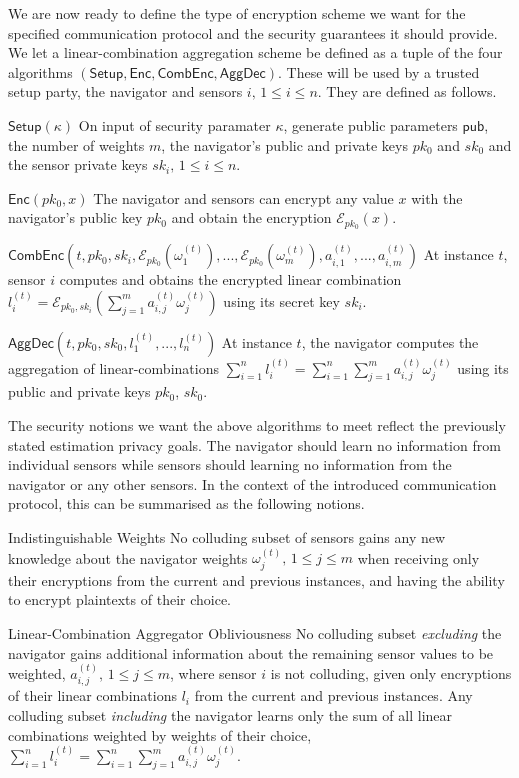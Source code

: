 \documentclass[10pt,letterpaper,oneside,twocolumn,journal]{IEEEtran}
\theoremstyle{definition}
\theoremstyle{definition}
\theoremstyle{remark}
\newcommand\shrtdots{\!...}
\begin{document}
We are now ready to define the type of encryption scheme we want for the specified communication protocol and the security guarantees it should provide. We let a linear-combination aggregation scheme be defined as a tuple of the four algorithms $(\mathsf{Setup}, \mathsf{Enc}, \mathsf{CombEnc}, \mathsf{AggDec})$. These will be used by a trusted setup party, the navigator and sensors $i,\,1\leq i \leq n$. They are defined as follows.
\begin{LaTeXdescription}
    \item[$\mathsf{Setup}(\kappa)$] On input of security paramater $\kappa$, generate public parameters $\mathsf{pub}$, the number of weights $m$, the navigator's public and private keys $pk_0$ and $sk_0$ and the sensor private keys $sk_i,\,1\leq i \leq n$.
    \item[$\mathsf{Enc}(pk_0, x)$] The navigator and sensors can encrypt any value $x$ with the navigator's public key $pk_0$ and obtain the encryption $\mathcal{E}_{pk_0}(x)$.
    \item[$\mathsf{CombEnc}(t, pk_0, sk_i, \mathcal{E}_{pk_0}(\omega_1^{(t)}),\shrtdots,\mathcal{E}_{pk_0}(\omega_m^{(t)}), a^{(t)}_{i,1},\shrtdots,a^{(t)}_{i,m})$] At instance $t$, sensor $i$ computes and obtains the encrypted linear combination $l^{(t)}_i = \mathcal{E}_{pk_0,sk_i}(\sum^m_{j=1}a^{(t)}_{i,j}\omega^{(t)}_j)$ using its secret key $sk_i$.
    \item[$\mathsf{AggDec}(t, pk_0, sk_0, l^{(t)}_1,\shrtdots,l^{(t)}_n)$] At instance $t$, the navigator computes the aggregation of linear-combinations $\sum^{n}_{i=1}l_i^{(t)}=\sum^{n}_{i=1}\sum^{m}_{j=1} a^{(t)}_{i,j}\omega^{(t)}_j$ using its public and private keys $pk_0$, $sk_0$.
\end{LaTeXdescription}
The security notions we want the above algorithms to meet reflect the previously stated estimation privacy goals. The navigator should learn no information from individual sensors while sensors should learning no information from the navigator or any other sensors. In the context of the introduced communication protocol, this can be summarised as the following notions.
\begin{LaTeXdescription}
    \item[Indistinguishable Weights] No colluding subset of sensors gains any new knowledge about the navigator weights $\omega^{(t)}_j,\,1\leq j \leq m$ when receiving only their encryptions from the current and previous instances, and having the ability to encrypt plaintexts of their choice.
    \item[Linear-Combination Aggregator Obliviousness] No colluding subset \textit{excluding} the navigator gains additional information about the remaining sensor values to be weighted, $a^{(t)}_{i,j},\,1\leq j\leq m$, where sensor $i$ is not colluding, given only encryptions of their linear combinations $l_i$ from the current and previous instances. Any colluding subset \textit{including} the navigator learns only the sum of all linear combinations weighted by weights of their choice, $\sum^{n}_{i=1}l_i^{(t)}=\sum^{n}_{i=1}\sum^{m}_{j=1} a^{(t)}_{i,j}\omega^{(t)}_j$.
\end{LaTeXdescription}
\end{document}
